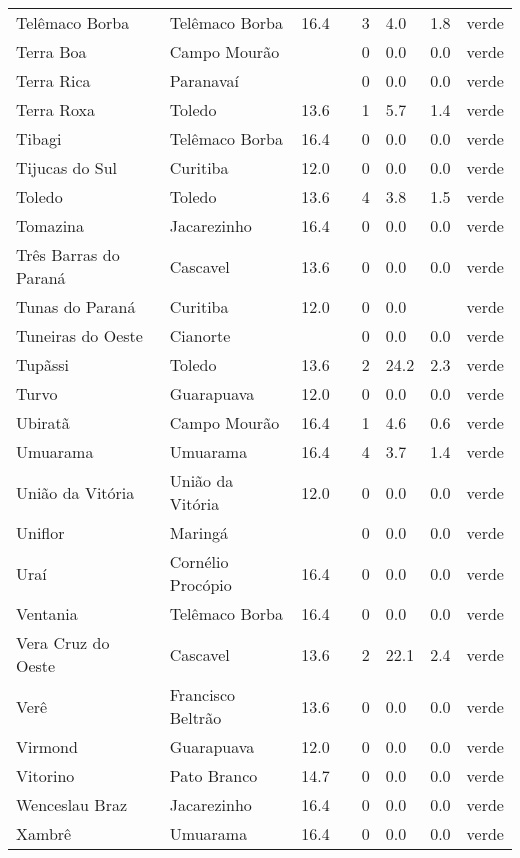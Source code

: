 \begin{longtable}{l|lllllll}
  Telêmaco Borba & Telêmaco Borba & 16.4 &  & 3 & 4.0 & 1.8 & verde \\ 
  Terra Boa & Campo Mourão &  &  & 0 & 0.0 & 0.0 & verde \\ 
  Terra Rica & Paranavaí &  &  & 0 & 0.0 & 0.0 & verde \\ 
  Terra Roxa & Toledo & 13.6 &  & 1 & 5.7 & 1.4 & verde \\ 
  Tibagi & Telêmaco Borba & 16.4 &  & 0 & 0.0 & 0.0 & verde \\ 
  Tijucas do Sul & Curitiba & 12.0 &  & 0 & 0.0 & 0.0 & verde \\ 
  Toledo & Toledo & 13.6 &  & 4 & 3.8 & 1.5 & verde \\ 
  Tomazina & Jacarezinho & 16.4 &  & 0 & 0.0 & 0.0 & verde \\ 
  Três Barras do Paraná & Cascavel & 13.6 &  & 0 & 0.0 & 0.0 & verde \\ 
  Tunas do Paraná & Curitiba & 12.0 &  & 0 & 0.0 &  & verde \\ 
  Tuneiras do Oeste & Cianorte &  &  & 0 & 0.0 & 0.0 & verde \\ 
  Tupãssi & Toledo & 13.6 &  & 2 & 24.2 & 2.3 & verde \\ 
  Turvo & Guarapuava & 12.0 &  & 0 & 0.0 & 0.0 & verde \\ 
  Ubiratã & Campo Mourão & 16.4 &  & 1 & 4.6 & 0.6 & verde \\ 
  Umuarama & Umuarama & 16.4 &  & 4 & 3.7 & 1.4 & verde \\ 
  União da Vitória & União da Vitória & 12.0 &  & 0 & 0.0 & 0.0 & verde \\ 
  Uniflor & Maringá &  &  & 0 & 0.0 & 0.0 & verde \\ 
  Uraí & Cornélio Procópio & 16.4 &  & 0 & 0.0 & 0.0 & verde \\ 
  Ventania & Telêmaco Borba & 16.4 &  & 0 & 0.0 & 0.0 & verde \\ 
  Vera Cruz do Oeste & Cascavel & 13.6 &  & 2 & 22.1 & 2.4 & verde \\ 
  Verê & Francisco Beltrão & 13.6 &  & 0 & 0.0 & 0.0 & verde \\ 
  Virmond & Guarapuava & 12.0 &  & 0 & 0.0 & 0.0 & verde \\ 
  Vitorino & Pato Branco & 14.7 &  & 0 & 0.0 & 0.0 & verde \\ 
  Wenceslau Braz & Jacarezinho & 16.4 &  & 0 & 0.0 & 0.0 & verde \\ 
  Xambrê & Umuarama & 16.4 &  & 0 & 0.0 & 0.0 & verde \\ 
  \hline
\end{longtable}
